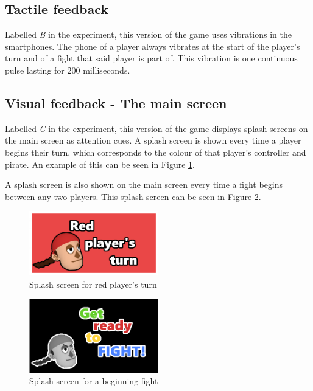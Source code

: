 \subsection{Tactile feedback}\label{sub:tactile_feedback}
Labelled \textit{B} in the experiment, this version of the game uses vibrations in the smartphones. The phone of a player always vibrates at the start of the player's turn and of a fight that said player is part of. This vibration is one continuous pulse lasting for 200 milliseconds.

\subsection{Visual feedback - The main screen}\label{sub:visual_main}
Labelled \textit{C} in the experiment, this version of the game displays splash screens on the main screen as attention cues. A splash screen is shown every time a player begins their turn, which corresponds to the colour of that player's controller and pirate. An example of this can be seen in Figure \ref{fig:redturn}.

A splash screen is also shown on the main screen every time a fight begins between any two players. This splash screen can be seen in Figure \ref{fig:fight_splash}.

\begin{figure}[h!]
	\centering
	\includegraphics[width=0.5\textwidth]{figures/redturn.png}
	\caption{Splash screen for red player's turn}\label{fig:redturn}
\end{figure}

\begin{figure}[h!]
	\centering
	\includegraphics[width=0.5\textwidth]{figures/getready.png}
	\caption{Splash screen for a beginning fight}\label{fig:fight_splash}
\end{figure}

